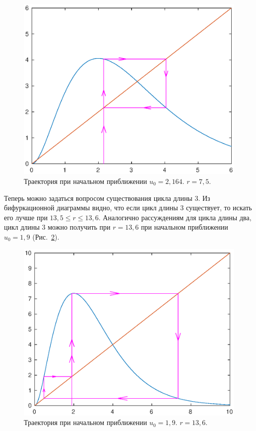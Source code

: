 \begin{figure}[h]
        \centering
        \includegraphics[width=0.8\linewidth]{img/one_step_cycle2_total.eps}
        \caption{Траектория при начальном приближении $u_0 = 2,164$. $r = 7,5$.}
        \label{img:one_step_cycle2_total}
\end{figure}

Теперь можно задаться вопросом существования цикла длины 3. Из бифуркационной диаграммы видно, что если цикл длины 3 существует, то искать его лучше при $13,5 \leqslant r \leqslant 13,6$. Аналогично рассуждениям для цикла длины два, цикл длины 3 можно получить при $r = 13,6$ при начальном приближении $u_0 = 1,9$ (Рис.~\ref{img:one_step_cycle3}).

\begin{figure}[h]
        \centering
        \includegraphics[width=0.8\linewidth]{img/one_step_cycle3.eps}
        \caption{Траектория при начальном приближении $u_0 = 1,9$. $r = 13,6$.}
        \label{img:one_step_cycle3}
\end{figure}
